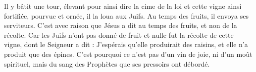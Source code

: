 Il y bâtit une tour, élevant pour ainsi dire la cime de la loi et cette vigne ainsi fortifiée, pourvue et ornée, il la loua aux Juifs. Au temps des fruits, il envoya ses serviteurs. C’est avec raison que Jésus a dit au temps des fruits, et non de la récolte. Car les Juifs n’ont pas donné de fruit et nulle fut la récolte de cette vigne, dont le Seigneur a dit : J’espérais qu’elle produirait des raisins, et elle n’a produit que des épines. C’est pourquoi ce n’est pas d’un vin de joie, ni d’un moût spirituel, mais du sang des Prophètes que ses pressoirs ont débordé.
